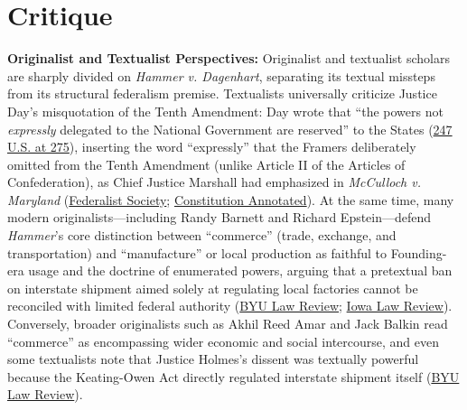 \documentclass[12pt]{article}
\begin{document}
\section{Critique}
\textbf{Originalist and Textualist Perspectives:} Originalist and textualist scholars are sharply divided on \textit{Hammer v. Dagenhart}, separating its textual missteps from its structural federalism premise. Textualists universally criticize Justice Day's misquotation of the Tenth Amendment: Day wrote that ``the powers not \textit{expressly} delegated to the National Government are reserved'' to the States (\href{https://supreme.justia.com/cases/federal/us/247/251/}{247 U.S. at 275}), inserting the word ``expressly'' that the Framers deliberately omitted from the Tenth Amendment (unlike Article II of the Articles of Confederation), as Chief Justice Marshall had emphasized in \textit{McCulloch v. Maryland} (\href{https://fedsoc.org/case/hammer-v-dagenhart}{Federalist Society}; \href{https://constitution.congress.gov/browse/essay/amdt10-3-3/ALDE_00013623/}{Constitution Annotated}). At the same time, many modern originalists---including Randy Barnett and Richard Epstein---defend \textit{Hammer}'s core distinction between ``commerce'' (trade, exchange, and transportation) and ``manufacture'' or local production as faithful to Founding-era usage and the doctrine of enumerated powers, arguing that a pretextual ban on interstate shipment aimed solely at regulating local factories cannot be reconciled with limited federal authority (\href{https://digitalcommons.law.byu.edu/cgi/viewcontent.cgi?article=3408&context=lawreview}{BYU Law Review}; \href{https://ilr.law.uiowa.edu/sites/ilr.law.uiowa.edu/files/2024-03/ILR-109-Coan-Schwartz_0.pdf}{Iowa Law Review}). Conversely, broader originalists such as Akhil Reed Amar and Jack Balkin read ``commerce'' as encompassing wider economic and social intercourse, and even some textualists note that Justice Holmes's dissent was textually powerful because the Keating-Owen Act directly regulated interstate shipment itself (\href{https://digitalcommons.law.byu.edu/cgi/viewcontent.cgi?article=3408&context=lawreview}{BYU Law Review}).
\end{document}
